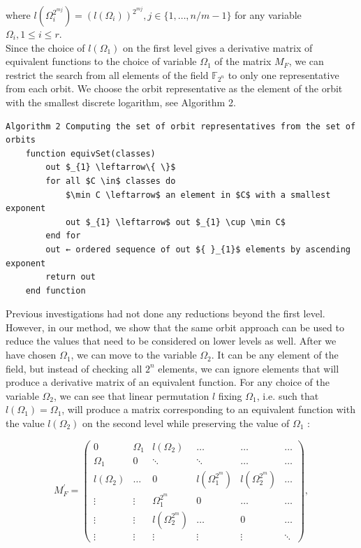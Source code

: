 \documentclass[10pt]{article}
\begin{document}
where $l\left(\Omega_{i}^{2^{m j}}\right)=\left(l\left(\Omega_{i}\right)\right)^{2^{m j}}, j \in\{1, \ldots, n / m-1\}$ for any variable $\Omega_{i}, 1 \leq i \leq r$.\\
Since the choice of $l\left(\Omega_{1}\right)$ on the first level gives a derivative matrix of equivalent functions to the choice of variable $\Omega_{1}$ of the matrix $M_{F}$, we can restrict the search from all elements of the field $\mathbb{F}_{2^{n}}$ to only one representative from each orbit. We choose the orbit representative as the element of the orbit with the smallest discrete logarithm, see Algorithm 2.

\begin{verbatim}
Algorithm 2 Computing the set of orbit representatives from the set of orbits
    function equivSet(classes)
        out $_{1} \leftarrow\{ \}$
        for all $C \in$ classes do
            $\min C \leftarrow$ an element in $C$ with a smallest exponent
            out $_{1} \leftarrow$ out $_{1} \cup \min C$
        end for
        out ← ordered sequence of out ${ }_{1}$ elements by ascending exponent
        return out
    end function
\end{verbatim}

Previous investigations had not done any reductions beyond the first level. However, in our method, we show that the same orbit approach can be used to reduce the values that need to be considered on lower levels as well. After we have chosen $\Omega_{1}$, we can move to the variable $\Omega_{2}$. It can be any element of the field, but instead of checking all $2^{n}$ elements, we can ignore elements that will produce a derivative matrix of an equivalent function. For any choice of the variable $\Omega_{2}$, we can see that linear permutation $l$ fixing $\Omega_{1}$, i.e. such that $l\left(\Omega_{1}\right)=\Omega_{1}$, will produce a matrix corresponding to an equivalent function with the value $l\left(\Omega_{2}\right)$ on the second level while preserving the value of $\Omega_{1}$ :

$$
M_{F}^{\prime}=\left(\begin{array}{cccccc}
0 & \Omega_{1} & l\left(\Omega_{2}\right) & \ldots & \ldots & \ldots \\
\Omega_{1} & 0 & \ddots & \ddots & \ldots & \ldots \\
l\left(\Omega_{2}\right) & \ldots & 0 & l\left(\Omega_{1}^{2^{m}}\right) & l\left(\Omega_{2}^{2^{m}}\right) & \ldots \\
\vdots & \vdots & \Omega_{1}^{2^{m}} & 0 & \ldots & \ldots \\
\vdots & \vdots & l\left(\Omega_{2}^{2^{m}}\right) & \ldots & 0 & \ldots \\
\vdots & \vdots & \vdots & \vdots & \vdots & \ddots
\end{array}\right),
$$
\end{document}
